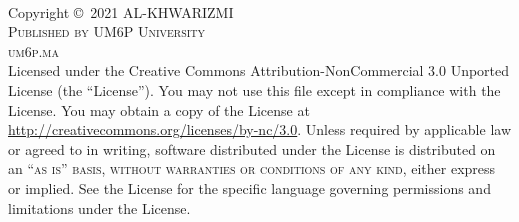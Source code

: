 \documentclass[11pt,fleqn]{book} %
\begin{document}

\begingroup
\thispagestyle{empty} %
\vfill
\endgroup

%



\newpage
~\vfill
\thispagestyle{empty}

\noindent Copyright \copyright\ 2021 AL-KHWARIZMI\\ %

\noindent \textsc{Published by UM6P University}\\ %

\noindent \textsc{um6p.ma}\\ %

\noindent Licensed under the Creative Commons Attribution-NonCommercial 3.0 Unported License (the ``License''). You may not use this file except in compliance with the License. You may obtain a copy of the License at \url{http://creativecommons.org/licenses/by-nc/3.0}. Unless required by applicable law or agreed to in writing, software distributed under the License is distributed on an \textsc{``as is'' basis, without warranties or conditions of any kind}, either express or implied. See the License for the specific language governing permissions and limitations under the License.\\ %
\end{document}
